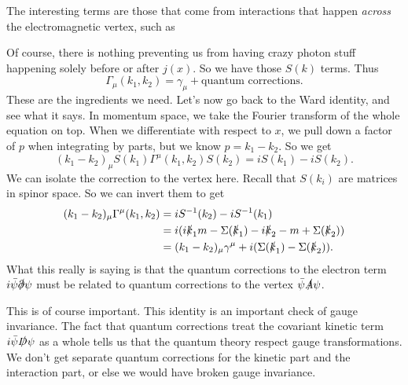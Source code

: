 \documentclass[a4paper]{article}
\begin{document}
The interesting terms are those that come from interactions that happen \emph{across} the electromagnetic vertex, such as
\begin{center}
\end{center}
Of course, there is nothing preventing us from having crazy photon stuff happening solely before or after $j(x)$. So we have those $S(k)$ terms. Thus
\[
  \Gamma_\mu(k_1, k_2) = \gamma_\mu + \text{quantum corrections}.
\]
These are the ingredients we need. Let's now go back to the Ward identity, and see what it says. In momentum space, we take the Fourier transform of the whole equation on top. When we differentiate with respect to $x$, we pull down a factor of $p$ when integrating by parts, but we know $p = k_1 - k_2$. So we get
\[
  (k_1 - k_2)_\mu S(k_1) \Gamma^\mu (k_1, k_2) S(k_2) = i S(k_1) - i S(k_2).
\]
We can isolate the correction to the vertex here. Recall that $S(k_i)$ are matrices in spinor space. So we can invert them to get
\begin{align*}
  (k_1 - k_2)_\mu \Gamma^\mu(k_1, k_2) &= i S^{-1}(k_2) - i S^{-1}(k_1)\\
  &= i (i \slashed{k}_1 m - \Sigma(\slashed{k}_1) - i \slashed{k}_2 - m + \Sigma(\slashed{k}_2))\\
  &= (k_1 - k_2)_\mu \gamma^\mu + i (\Sigma(\slashed{k}_1) - \Sigma(\slashed{k}_2)).
\end{align*}
What this really is saying is that the quantum corrections to the electron term $i \bar\psi \slashed \partial \psi$ must be related to quantum corrections to the vertex $\bar\psi \slashed{A} \psi$.

This is of course important. This identity is an important check of gauge invariance. The fact that quantum corrections treat the covariant kinetic term $i \bar\psi \slashed D \psi$ as a whole tells us that the quantum theory respect gauge transformations. We don't get separate quantum corrections for the kinetic part and the interaction part, or else we would have broken gauge invariance.
\end{document}
